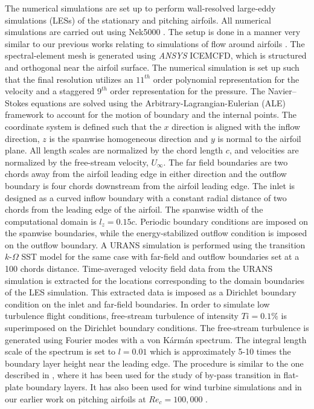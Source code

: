 The numerical simulations are set up to perform wall-resolved large-eddy simulations (LESs) of the stationary and pitching airfoils. All numerical simulations are carried out using Nek5000 \citep{nek5000}. The setup is done in a manner very similar to our previous works relating to simulations of flow around airfoils \citep{hosseini16,proc-tsfp10-vinuesa,proc-tsfp10-negi}. The spectral-element mesh is generated using \textit{ANSYS}\textsuperscript{\textregistered} ICEMCFD, which is structured and orthogonal near the airfoil surface. The numerical simulation is set up such that the final resolution utilizes an $11^{th}$ order polynomial representation for the velocity and a staggered $9^{th}$ order representation for the pressure. The Navier--Stokes equations are solved using the Arbitrary-Lagrangian-Eulerian (ALE) framework \citep{ho90,ho91} to account for the motion of boundary and the internal points. The coordinate system is defined such that the $x$ direction is aligned with the inflow direction, $z$ is the spanwise homogeneous direction and $y$ is normal to the airfoil plane. All length scales are normalized by the chord length $c$, and velocities are normalized by the free-stream velocity, $U_{\infty}$. The far field boundaries are two chords away from the airfoil leading edge in either direction and the outflow boundary is four chords downstream from the airfoil leading edge. The inlet is designed as a curved inflow boundary with a constant radial distance of two chords from the leading edge of the airfoil. The spanwise width of the computational domain is $l_{z}=0.15c$. Periodic boundary conditions are imposed on the spanwise boundaries, while the energy-stabilized outflow condition \citep{dong2014} is imposed on the outflow boundary. A URANS simulation is performed using the transition $k$-$\Omega$ SST model \citep{langtry09} for the same case with far-field and outflow boundaries set at a 100 chords distance. Time-averaged velocity field data from the URANS simulation is extracted for the locations corresponding to the domain boundaries of the LES simulation. This extracted data is imposed as a Dirichlet boundary condition on the inlet and far-field boundaries. In order to simulate low turbulence flight conditions, free-stream turbulence of intensity $Ti=0.1\%$ is superimposed on the Dirichlet boundary conditions. The free-stream turbulence is generated using Fourier modes with a von K\'arm\'an spectrum. The integral length scale of the spectrum is set to $l=0.01$ which is approximately 5-10 times the boundary layer height near the leading edge. The procedure is similar to the one described in \cite{schlatterdiploma,brandt04,schlatter08}, where it has been used for the study of by-pass transition in flat-plate boundary layers. It has also been used for wind turbine simulations \citep{kleusberglicenciate} and in our earlier work on pitching airfoils at $Re_{c}=100,000$ \citep{proc-tsfp10-negi}.

